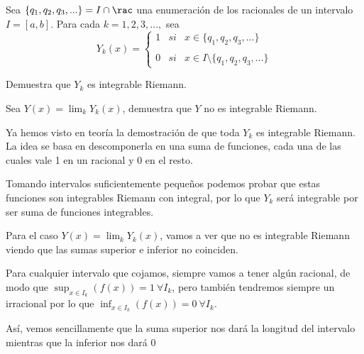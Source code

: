 \begin{problem}[3]
Sea $\{q_1,q_2,q_3,...\} = I \cap \rac$ una enumeración de los racionales de un intervalo $I=[a,b]$. Para cada $k=1,2,3,...,$ sea
\[Y_k(x)= \left\{ \begin{array}{lcc}
             1 &   si  & x \in \{q_1,q_2,q_3,...\} \\
             \\ 0 &  si  & x \in I \setminus \{q_1,q_2,q_3,...\}
             \end{array}
   \right.\]

Demuestra que $Y_k$ es integrable Riemann.

Sea $Y(x)=\lim_kY_k(x)$, demuestra que $Y$ no es integrable Riemann.

\solution

Ya hemos visto en teoría la demostración de que toda $Y_k$ es integrable Riemann. La idea se basa en descomponerla en una suma de funciones, cada una de las cuales vale 1 en un racional y 0 en el resto.

Tomando intervalos suficientemente pequeños podemos probar que estas funciones son integrables Riemann con integral, por lo que $Y_k$ será integrable por ser suma de funciones integrables.

Para el caso $Y(x)=\lim_kY_k(x)$, vamos a ver que no es integrable Riemann viendo que las sumas superior e inferior no coinciden.

Para cualquier intervalo que cojamos, siempre vamos a tener algún racional, de modo que $\sup_{x \in I_k} (f(x)) = 1 \ \forall I_k$, pero también tendremos siempre un irracional por lo que $\inf_{x \in I_k} (f(x)) = 0 \ \forall I_k$.

Así, vemos sencillamente que la suma superior nos dará la longitud del intervalo mientras que la inferior nos dará 0
\end{problem}

